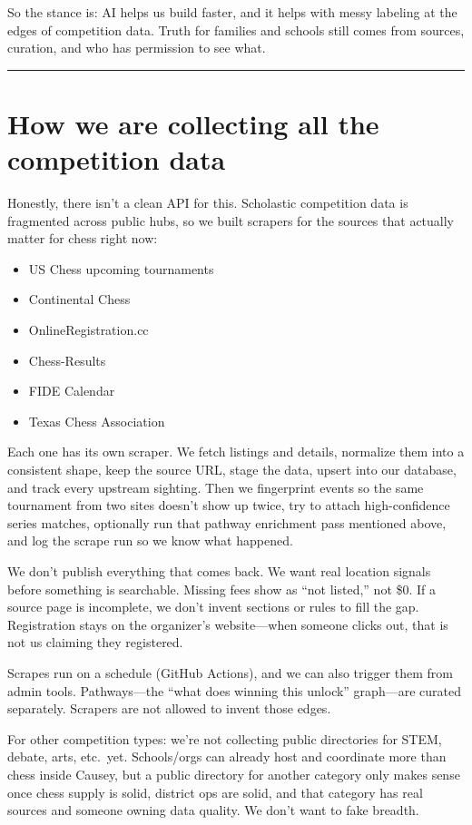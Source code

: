 \documentclass[11pt]{article}
\begin{document}
So the stance is: AI helps us build faster, and it helps with messy labeling at the edges of competition data. Truth for families and schools still comes from sources, curation, and who has permission to see what.

\vspace{0.5em}
\hrule
\vspace{1em}

\section*{How we are collecting all the competition data}

Honestly, there isn't a clean API for this. Scholastic competition data is fragmented across public hubs, so we built scrapers for the sources that actually matter for chess right now:

\begin{itemize}
  \item US Chess upcoming tournaments
  \item Continental Chess
  \item OnlineRegistration.cc
  \item Chess-Results
  \item FIDE Calendar
  \item Texas Chess Association
\end{itemize}

Each one has its own scraper. We fetch listings and details, normalize them into a consistent shape, keep the source URL, stage the data, upsert into our database, and track every upstream sighting. Then we fingerprint events so the same tournament from two sites doesn't show up twice, try to attach high-confidence series matches, optionally run that pathway enrichment pass mentioned above, and log the scrape run so we know what happened.

We don't publish everything that comes back. We want real location signals before something is searchable. Missing fees show as ``not listed,'' not \$0. If a source page is incomplete, we don't invent sections or rules to fill the gap. Registration stays on the organizer's website---when someone clicks out, that is not us claiming they registered.

Scrapes run on a schedule (GitHub Actions), and we can also trigger them from admin tools. Pathways---the ``what does winning this unlock'' graph---are curated separately. Scrapers are not allowed to invent those edges.

For other competition types: we're not collecting public directories for STEM, debate, arts, etc.\ yet. Schools/orgs can already host and coordinate more than chess inside Causey, but a public directory for another category only makes sense once chess supply is solid, district ops are solid, and that category has real sources and someone owning data quality. We don't want to fake breadth.
\end{document}
